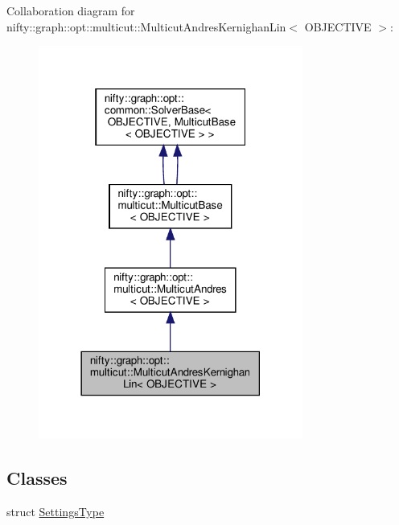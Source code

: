 Collaboration diagram for nifty\+:\+:graph\+:\+:opt\+:\+:multicut\+:\+:Multicut\+Andres\+Kernighan\+Lin$<$ O\+B\+J\+E\+C\+T\+I\+VE $>$\+:
\nopagebreak
\begin{figure}[H]
\begin{center}
\leavevmode
\includegraphics[width=246pt]{classnifty_1_1graph_1_1opt_1_1multicut_1_1MulticutAndresKernighanLin__coll__graph}
\end{center}
\end{figure}
\subsection*{Classes}
\begin{DoxyCompactItemize}
\item 
struct \hyperlink{structnifty_1_1graph_1_1opt_1_1multicut_1_1MulticutAndresKernighanLin_1_1SettingsType}{Settings\+Type}
\end{DoxyCompactItemize}
